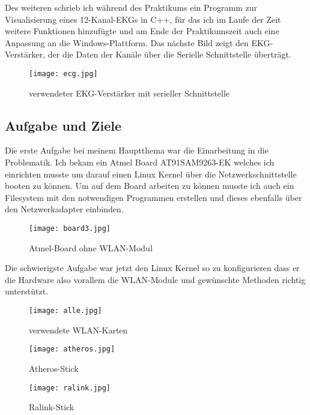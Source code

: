 \documentclass[pdftex,12pt,a4paper]{scrartcl}
\begin{document}
Des weiteren schrieb ich während des Praktikums ein Programm zur Visualisierung eines 12-Kanal-EKGs in C++, für das ich im Laufe der Zeit weitere Funktionen hinzufügte und am Ende der Praktikumszeit auch eine Anpassung an die Windows-Plattform.
Das nächste Bild zeigt den EKG-Verstärker, der die Daten der Kanäle über die Serielle Schnittstelle überträgt.
\begin{figure}[H] %
    \centering
    \texttt{[image: ecg.jpg]}
    \caption{verwendeter EKG-Verstärker mit serieller Schnittstelle}
\end{figure}
\subsection{Aufgabe und Ziele}
Die erste Aufgabe bei meinem Hauptthema war die Einarbeitung in die Problematik.
Ich bekam ein Atmel Board AT91SAM9263-EK welches ich einrichten musste um darauf einen Linux Kernel über die Netzwerkschnittstelle booten zu können.
Um auf dem Board arbeiten zu können musste ich auch ein Filesystem mit den notwendigen Programmen erstellen und dieses ebenfalls über den Netzwerkadapter einbinden.
\begin{figure}[H] %
    \centering
    \texttt{[image: board3.jpg]}
    \caption{Atmel-Board ohne WLAN-Modul}
\end{figure}
Die schwierigste Aufgabe war jetzt den Linux Kernel so zu konfigurieren dass er die Hardware also vorallem die WLAN-Module und gewünschte Methoden richtig unterstützt.
\begin{figure}[H] %
    \centering
    \texttt{[image: alle.jpg]}
    \caption{verwendete WLAN-Karten}
\end{figure}
\begin{figure}[H] %
    \centering
    \texttt{[image: atheros.jpg]}
    \caption{Atheros-Stick}
\end{figure}
\begin{figure}[H] %
    \centering
    \texttt{[image: ralink.jpg]}
    \caption{Ralink-Stick}
\end{figure}
\end{document}
